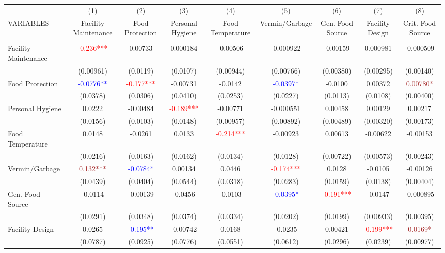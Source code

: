 \begin{tabular}{lcccccccc} \hline
 & (1) & (2) & (3) & (4) & (5) & (6) & (7) & (8) \\
VARIABLES & Facility Maintenance & Food Protection & Personal Hygiene & Food Temperature & Vermin/Garbage & Gen. Food Source & Facility Design & Crit. Food Source \\ \hline
 &  &  &  &  &  &  &  &  \\
Facility Maintenance & \textcolor{red}{-0.236***} & 0.00733 & 0.000184 & -0.00506 & -0.000922 & -0.00159 & 0.000981 & -0.000509 \\
 & (0.00961) & (0.0119) & (0.0107) & (0.00944) & (0.00766) & (0.00380) & (0.00295) & (0.00140) \\
Food Protection & \textcolor{blue}{-0.0776**} & \textcolor{red}{-0.177***} & -0.00731 & -0.0142 & \textcolor{blue}{-0.0397*} & -0.0100 & 0.00372 & \textcolor{brown}{0.00780*} \\
 & (0.0378) & (0.0306) & (0.0410) & (0.0253) & (0.0227) & (0.0113) & (0.0108) & (0.00400) \\
Personal Hygiene & 0.0222 & -0.00484 & \textcolor{red}{-0.189***} & -0.00771 & -0.000551 & 0.00458 & 0.00129 & 0.00217 \\
 & (0.0156) & (0.0103) & (0.0148) & (0.00957) & (0.00892) & (0.00489) & (0.00320) & (0.00173) \\
Food Temperature & 0.0148 & -0.0261 & 0.0133 & \textcolor{red}{-0.214***} & -0.00923 & 0.00613 & -0.00622 & -0.00153 \\
 & (0.0216) & (0.0163) & (0.0162) & (0.0134) & (0.0128) & (0.00722) & (0.00573) & (0.00243) \\
Vermin/Garbage & \textcolor{brown}{0.132***} & \textcolor{blue}{-0.0784*} & 0.00134 & 0.0446 & \textcolor{red}{-0.174***} & 0.0128 & -0.0105 & -0.00126 \\
 & (0.0439) & (0.0404) & (0.0544) & (0.0318) & (0.0283) & (0.0159) & (0.0138) & (0.00404) \\
Gen. Food Source & -0.0114 & -0.00139 & -0.0456 & -0.0103 & \textcolor{blue}{-0.0395*} & \textcolor{red}{-0.191***} & -0.0147 & -0.000895 \\
 & (0.0291) & (0.0348) & (0.0374) & (0.0334) & (0.0202) & (0.0199) & (0.00933) & (0.00395) \\
Facility Design & 0.0265 & \textcolor{blue}{-0.195**} & -0.00742 & 0.0168 & -0.0235 & 0.00421 & \textcolor{red}{-0.199***} & \textcolor{brown}{0.0169*} \\
 & (0.0787) & (0.0925) & (0.0776) & (0.0551) & (0.0612) & (0.0296) & (0.0239) & (0.00977) \\

\end{tabular}

